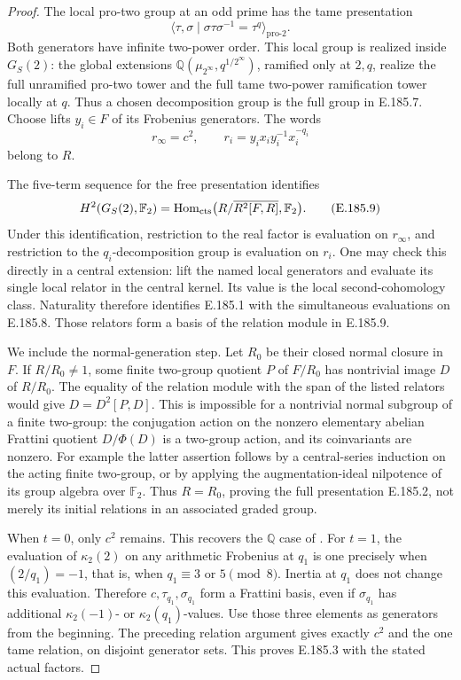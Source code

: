 \begin{proof}
The local pro-two group at an odd prime has the tame
presentation
\[
 \langle \tau,\sigma\mid\sigma\tau\sigma^{-1}=\tau^q
             \rangle_{\mathrm{pro}\text{-}2}.
 \tag{E.185.7}
\]
Both generators have infinite two-power order. This local
group is realized inside \(G_S(2)\): the global extensions
\(\mathbb Q(\mu_{2^\infty},q^{1/2^\infty})\), ramified
only at \(2,q\), realize the full unramified pro-two tower
and the full tame two-power ramification tower locally at
\(q\). Thus a chosen decomposition group is the full group
in E.185.7. Choose lifts \(y_i\in F\) of its Frobenius
generators. The words
\[
 r_\infty=c^2,\qquad
             r_i=y_i x_i y_i^{-1}x_i^{-q_i}
 \tag{E.185.8}
\]
belong to \(R\).

The five-term sequence for the free presentation identifies
\[
 H^2(G_S(2),\mathbb F_2)
      =\operatorname{Hom}_{\rm cts}
          \bigl(R/\overline{R^2[F,R]},\mathbb F_2\bigr).
 \tag{E.185.9}
\]
Under this identification, restriction to the real factor
is evaluation on \(r_\infty\), and restriction to the
\(q_i\)-decomposition group is evaluation on \(r_i\).
One may check this directly in a central extension: lift
the named local generators and evaluate its single local
relator in the central kernel. Its value is the local
second-cohomology class. Naturality therefore identifies
E.185.1 with the simultaneous evaluations on E.185.8.
Those relators form a basis of the relation module in
E.185.9.

We include the normal-generation step. Let \(R_0\) be
their closed normal closure in \(F\). If
\(R/R_0\ne1\), some finite two-group quotient \(P\) of
\(F/R_0\) has nontrivial image \(D\) of \(R/R_0\).
The equality of the relation module with the span of the
listed relators would give
\(D=D^2[P,D]\). This is impossible for a nontrivial
normal subgroup of a finite two-group: the conjugation
action on the nonzero elementary abelian Frattini
quotient \(D/\Phi(D)\) is a two-group action, and its
coinvariants are nonzero. For example the latter assertion
follows by a central-series induction on the acting finite
two-group, or by applying the augmentation-ideal nilpotence
of its group algebra over \(\mathbb F_2\).
Thus \(R=R_0\), proving the full presentation E.185.2,
not merely its initial relations in an associated graded
group.

When \(t=0\), only \(c^2\) remains. This recovers the
\(\mathbb Q\) case of
\citet[Theorem~2 and proof, author p.~3]{LitGrasJaulent2009}.
For \(t=1\), the evaluation of \(\kappa_2(2)\) on any
arithmetic Frobenius at \(q_1\) is one precisely when
\((2/q_1)=-1\), that is, when \(q_1\equiv3\) or
\(5\pmod8\). Inertia at \(q_1\) does not change this
evaluation. Therefore \(c,\tau_{q_1},\sigma_{q_1}\)
form a Frattini basis, even if \(\sigma_{q_1}\) has
additional \(\kappa_2(-1)\)- or \(\kappa_2(q_1)\)-values.
Use those three elements as generators from the beginning.
The preceding relation argument gives exactly \(c^2\)
and the one tame relation, on disjoint generator sets.
This proves E.185.3 with the stated actual factors.


\end{proof}
